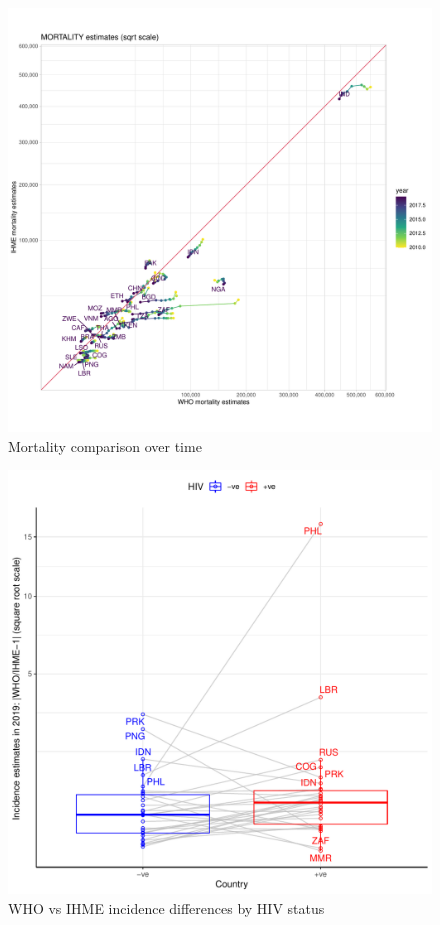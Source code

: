 \documentclass[12pt]{article}
\begin{document}
\begin{figure}
  \centering
  \includegraphics[width=1\textwidth]{../plots/aF2b.pdf}
  \caption{Mortality comparison over time}
\end{figure}

\FloatBarrier

\begin{figure}
  \centering
  \includegraphics[width=1\textwidth]{../plots/aF9.pdf}
  \caption{WHO vs IHME incidence differences by HIV status}
\end{figure}
\end{document}
